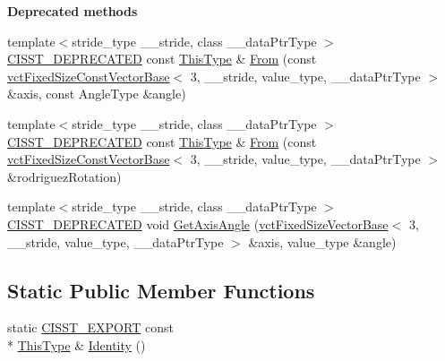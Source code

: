 \begin{Indent}{\bf Deprecated methods}\par
\begin{DoxyCompactItemize}
\item 
{\footnotesize template$<$stride\-\_\-type \-\_\-\-\_\-stride, class \-\_\-\-\_\-data\-Ptr\-Type $>$ }\\\hyperlink{cmn_portability_8h_a63da7164735f9501be651b1f2bbc0121}{C\-I\-S\-S\-T\-\_\-\-D\-E\-P\-R\-E\-C\-A\-T\-E\-D} const \hyperlink{classvct_quaternion_base_af28efdc38acf89acb7a67afada11408c}{This\-Type} \& \hyperlink{classvct_quaternion_rotation3_base_a2a79d881d43dd7b77a1e428d80060dba}{From} (const \hyperlink{classvct_fixed_size_const_vector_base}{vct\-Fixed\-Size\-Const\-Vector\-Base}$<$ 3, \-\_\-\-\_\-stride, value\-\_\-type, \-\_\-\-\_\-data\-Ptr\-Type $>$ \&axis, const Angle\-Type \&angle)
\item 
{\footnotesize template$<$stride\-\_\-type \-\_\-\-\_\-stride, class \-\_\-\-\_\-data\-Ptr\-Type $>$ }\\\hyperlink{cmn_portability_8h_a63da7164735f9501be651b1f2bbc0121}{C\-I\-S\-S\-T\-\_\-\-D\-E\-P\-R\-E\-C\-A\-T\-E\-D} const \hyperlink{classvct_quaternion_base_af28efdc38acf89acb7a67afada11408c}{This\-Type} \& \hyperlink{classvct_quaternion_rotation3_base_a2e5b033f5656aed1877476b90b332ecb}{From} (const \hyperlink{classvct_fixed_size_const_vector_base}{vct\-Fixed\-Size\-Const\-Vector\-Base}$<$ 3, \-\_\-\-\_\-stride, value\-\_\-type, \-\_\-\-\_\-data\-Ptr\-Type $>$ \&rodriguez\-Rotation)
\item 
{\footnotesize template$<$stride\-\_\-type \-\_\-\-\_\-stride, class \-\_\-\-\_\-data\-Ptr\-Type $>$ }\\\hyperlink{cmn_portability_8h_a63da7164735f9501be651b1f2bbc0121}{C\-I\-S\-S\-T\-\_\-\-D\-E\-P\-R\-E\-C\-A\-T\-E\-D} void \hyperlink{classvct_quaternion_rotation3_base_a7b6a4ed8830ee9153e9c387f5ea9a35a}{Get\-Axis\-Angle} (\hyperlink{classvct_fixed_size_vector_base}{vct\-Fixed\-Size\-Vector\-Base}$<$ 3, \-\_\-\-\_\-stride, value\-\_\-type, \-\_\-\-\_\-data\-Ptr\-Type $>$ \&axis, value\-\_\-type \&angle)
\end{DoxyCompactItemize}
\end{Indent}
\subsection*{Static Public Member Functions}
\begin{DoxyCompactItemize}
\item 
static \hyperlink{cmn_export_macros_8h_a99393e0c3ac434b2605235bbe20684f8}{C\-I\-S\-S\-T\-\_\-\-E\-X\-P\-O\-R\-T} const \\*
\hyperlink{classvct_quaternion_base_af28efdc38acf89acb7a67afada11408c}{This\-Type} \& \hyperlink{classvct_quaternion_rotation3_base_a9d08a3fdcfa011bd625af5e18f1e04d6}{Identity} ()
\end{DoxyCompactItemize}
